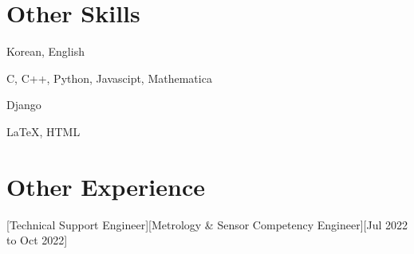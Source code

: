 \documentclass{article}
\begin{document}
\section{Other Skills}
\begin{description}[widest=Markup]
\item[Languages] Korean, English
\item[Programming Languages] C, C++, Python, Javascipt, Mathematica
\item[Framework] Django
\item[Markup] LaTeX, HTML
\end{description}
\section{Other Experience}
[Technical Support Engineer][Metrology \& Sensor Competency Engineer][Jul 2022 to Oct 2022]
\end{document}
